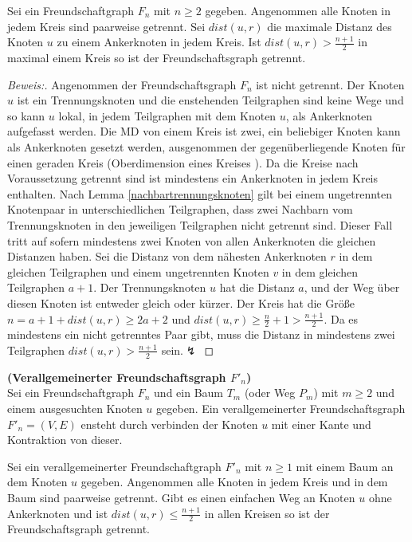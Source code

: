 \vspace{-1mm}
\begin{lem}
\label{fg}
Sei ein Freundschaftgraph $F_n$ mit $n\geq 2$ gegeben. Angenommen alle Knoten in jedem Kreis sind paarweise getrennt. Sei $dist(u,r)$ die maximale Distanz des Knoten $u$ zu einem Ankerknoten in jedem Kreis. Ist $dist(u,r)>\frac{n+1}{2}$ in maximal einem Kreis so ist der Freundschaftsgraph getrennt.
\end{lem}
\vspace{-4mm}
\begin{proof}[Beweis:]
Angenommen der Freundschaftsgraph $F_n$ ist nicht getrennt. Der Knoten $u$ ist ein Trennungsknoten und die enstehenden Teilgraphen sind keine Wege und so kann $u$ lokal, in jedem Teilgraphen mit dem Knoten $u$, als Ankerknoten aufgefasst werden. Die MD von einem Kreis ist zwei, ein beliebiger Knoten kann als Ankerknoten gesetzt werden, ausgenommen der gegenüberliegende Knoten für einen geraden Kreis (Oberdimension eines Kreises \cite{upper}). Da die Kreise nach Voraussetzung getrennt sind ist mindestens ein Ankerknoten in jedem Kreis enthalten. Nach Lemma \ref{nachbartrennungsknoten} gilt bei einem ungetrennten Knotenpaar in unterschiedlichen Teilgraphen, dass zwei Nachbarn vom Trennungsknoten in den jeweiligen Teilgraphen nicht getrennt sind.\newline
Dieser Fall tritt auf sofern mindestens zwei Knoten von allen Ankerknoten die gleichen Distanzen haben. Sei die Distanz von dem nähesten Ankerknoten $r$ in dem gleichen Teilgraphen und einem ungetrennten Knoten $v$ in dem gleichen Teilgraphen $a+1$. Der Trennungsknoten $u$ hat die Distanz $a$, und der Weg über diesen Knoten ist entweder gleich oder kürzer. Der Kreis hat die Größe $n=a+1+dist(u,r)\geq 2a+2$ und $dist(u,r)\geq \frac{n}{2}+1 > \frac{n+1}{2}$. Da es mindestens ein nicht getrenntes Paar gibt, muss die Distanz in mindestens zwei Teilgraphen $dist(u,r)> \frac{n+1}{2}$ sein.$\lightning$
\end{proof}
\begin{defi}{\textbf{(Verallgemeinerter Freundschaftsgraph $F'_n$)}}\\
Sei ein Freundschaftgraph $F_n$ und ein Baum $T_m$ (oder Weg $P_m$) mit $m \geq 2$ und einem ausgesuchten Knoten $u$ gegeben. Ein verallgemeinerter Freundschaftsgraph $F'_{n}=(V,E)$ ensteht durch verbinden der Knoten $u$ mit einer Kante und Kontraktion von dieser.
\end{defi}
\vspace{-2mm}
\begin{lem}
Sei ein verallgemeinerter Freundschaftgraph $F'_n$ mit $n\geq 1$ mit einem Baum an dem Knoten $u$ gegeben. Angenommen alle Knoten in jedem Kreis und in dem Baum sind paarweise getrennt. Gibt es einen einfachen Weg an Knoten $u$ ohne Ankerknoten und ist $dist(u,r)\leq \frac{n+1}{2}$ in allen Kreisen so ist der Freundschaftsgraph getrennt.
\end{lem}
